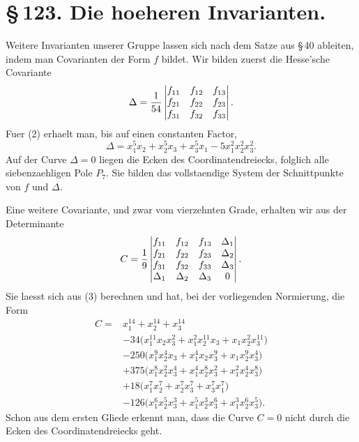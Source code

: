 \documentclass[11pt]{article}
\begin{document}
\section*{\S\,123. Die hoeheren Invarianten.}

Weitere Invarianten unserer Gruppe lassen sich nach dem Satze aus \S\,40 ableiten, indem man Covarianten der Form \(f\) bildet. Wir bilden zuerst die Hesse'sche Covariante
\begin{equation}
\Delta={1\over54}
\begin{vmatrix}
f_{11}&f_{12}&f_{13}\\
f_{21}&f_{22}&f_{23}\\
f_{31}&f_{32}&f_{33}
\end{vmatrix}.
\end{equation}
Fuer (2) erhaelt man, bis auf einen constanten Factor,
\begin{equation}
\Delta=x_1^5x_2+x_2^5x_3+x_3^5x_1-5x_1^2x_2^2x_3^2.
\tag{3}
\end{equation}
Auf der Curve \(\Delta=0\) liegen die Ecken des Coordinatendreiecks, folglich alle siebenzaehligen Pole \(P_7\). Sie bilden das vollstaendige System der Schnittpunkte von \(f\) und \(\Delta\).

Eine weitere Covariante, und zwar vom vierzehnten Grade, erhalten wir aus der Determinante
\begin{equation}
C={1\over9}
\begin{vmatrix}
f_{11}&f_{12}&f_{13}&\Delta_1\\
f_{21}&f_{22}&f_{23}&\Delta_2\\
f_{31}&f_{32}&f_{33}&\Delta_3\\
\Delta_1&\Delta_2&\Delta_3&0
\end{vmatrix}.
\end{equation}
Sie laesst sich aus (3) berechnen und hat, bei der vorliegenden Normierung, die Form
\begin{equation}
\begin{aligned}
C={}&x_1^{14}+x_2^{14}+x_3^{14}\\
&-34\bigl(x_1^{11}x_2x_3^2+x_1^2x_2^{11}x_3+x_1x_2^2x_3^{11}\bigr)\\
&-250\bigl(x_1^9x_2^4x_3+x_1^4x_2x_3^9+x_1x_2^9x_3^4\bigr)\\
&+375\bigl(x_1^8x_2^2x_3^4+x_1^4x_2^8x_3^2+x_1^2x_2^4x_3^8\bigr)\\
&+18\bigl(x_1^7x_2^7+x_2^7x_3^7+x_3^7x_1^7\bigr)\\
&-126\bigl(x_1^6x_2^5x_3^3+x_1^5x_2^3x_3^6+x_1^3x_2^6x_3^5\bigr).
\end{aligned}
\tag{4}
\end{equation}
Schon aus dem ersten Gliede erkennt man, dass die Curve \(C=0\) nicht durch die Ecken des Coordinatendreiecks geht.
\end{document}
